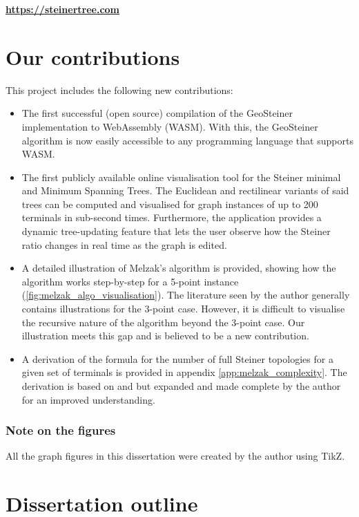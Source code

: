 \documentclass{l4proj}
\begin{document}
\begin{tcolorbox}[title=Access the end product here, colback=gray!10, colframe=gray!80]
    \centering
    \Huge{\textbf{\url{https://steinertree.com}}}
\end{tcolorbox}

\section{Our contributions}
This project includes the following new contributions:
\begin{itemize}
    \item The first successful (open source) compilation of the GeoSteiner implementation to WebAssembly (WASM). With this, the GeoSteiner algorithm is now easily accessible to any programming language that supports WASM.
    \item The first publicly available online visualisation tool for the Steiner minimal and Minimum Spanning Trees. The Euclidean and rectilinear variants of said trees can be computed and visualised for graph instances of up to 200 terminals in sub-second times. Furthermore, the application provides a dynamic tree-updating feature that lets the user observe how the Steiner ratio changes in real time as the graph is edited.
    \item A detailed illustration of Melzak's algorithm is provided, showing how the algorithm works step-by-step for a 5-point instance (\ref{fig:melzak_algo_visualisation}). The literature seen by the author generally contains illustrations for the 3-point case. However, it is difficult to visualise the recursive nature of the algorithm beyond the 3-point case. Our illustration meets this gap and is believed to be a new contribution.
    \item A derivation of the formula for the number of full Steiner topologies for a given set of terminals is provided in appendix \ref{app:melzak_complexity}. The derivation is based on \citet{geosteiner96} and \citet{Gilbert1968SteinerMT} but expanded and made complete by the author for an improved understanding.
\end{itemize}

\subsubsection{Note on the figures} All the graph figures in this dissertation were created by the author using TikZ.

\section{Dissertation outline}
\end{document}
